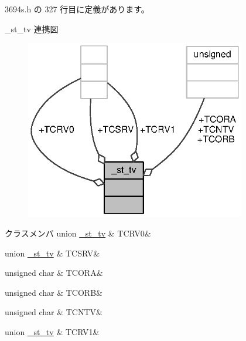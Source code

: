  3694s.\+h の 327 行目に定義があります。



\+\_\+st\+\_\+tv 連携図
\nopagebreak
\begin{figure}[H]
\begin{center}
\leavevmode
\includegraphics[width=273pt]{dd/d88/struct__st__tv__coll__graph}
\end{center}
\end{figure}
\begin{DoxyFields}{クラスメンバ}
union \hyperlink{3694s_8h_d2/d1d/union__st__tv_8TCRV0}{\+\_\+st\+\_\+tv}\label{3694s_8h_a5b33153a41b5150eb3853f90bd75f40e}
&
T\+C\+R\+V0&
\\
\hline

union \hyperlink{3694s_8h_df/df9/union__st__tv_8TCSRV}{\+\_\+st\+\_\+tv}\label{3694s_8h_acdb48e90fbc27da3e7ffd9d754c72088}
&
T\+C\+S\+R\+V&
\\
\hline

unsigned char\label{3694s_8h_a8edcc5805fa4b68fff994f3599058c19}
&
T\+C\+O\+R\+A&
\\
\hline

unsigned char\label{3694s_8h_a8716e735e0d1f96dbdb921873531b386}
&
T\+C\+O\+R\+B&
\\
\hline

unsigned char\label{3694s_8h_a3ef201d19d3aca251515cf92f440a731}
&
T\+C\+N\+T\+V&
\\
\hline

union \hyperlink{3694s_8h_dc/dd5/union__st__tv_8TCRV1}{\+\_\+st\+\_\+tv}\label{3694s_8h_a3f63db9aa6990198a80e05336257f926}
&
T\+C\+R\+V1&
\\
\hline

\end{DoxyFields}
\label{struct__st__ta}
